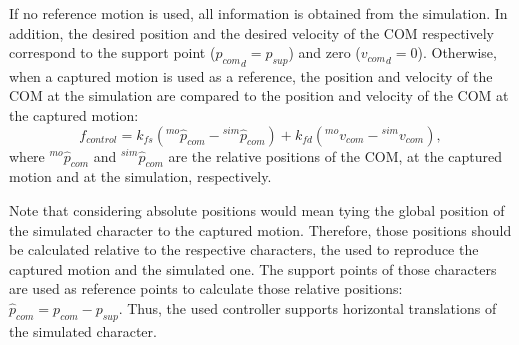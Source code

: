 \documentclass[tog]{acmsiggraph}
\begin{document}
If no reference motion is used, all information is obtained from the simulation.
In addition, the desired position and the desired velocity of the COM respectively correspond to the support point (${p_{com}}_d = p_{sup}$) and zero (${v_{com}}_d = 0$).
%
Otherwise, when a captured motion is used as a reference, the position and velocity of the COM at the simulation are compared to the position
and velocity of the COM at the captured motion:
%
\begin{equation}
  f_{control} = k_{fs} \left( {^{mo}\hat{p}_{com}} - {^{sim}\hat{p}_{com}} \right) + k_{fd} \left( {^{mo}v_{com}} - {^{sim}v_{com}} \right),
  \label{eq:forcacontrole2}
\end{equation}
%
where ${^{mo}\hat{p}_{com}}$ and ${^{sim}\hat{p}_{com}}$ are the relative positions of the COM, at the captured motion and at the simulation, respectively.

Note that considering absolute positions would mean tying the global position of the simulated character to the captured motion. Therefore, those positions
should be calculated relative to the respective characters, the used to reproduce the captured motion and the simulated one.
The support points of those characters are used as reference points to calculate those relative positions: ${\hat{p}_{com}} = p_{com} - p_{sup}$.
%
Thus, the used controller supports horizontal translations of the simulated character.

\end{document}
